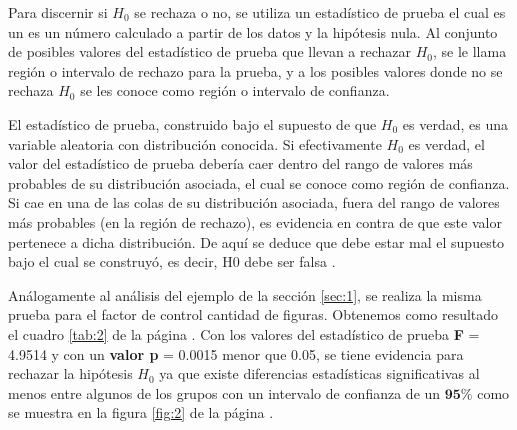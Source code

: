 \documentclass{article}
\begin{document}
Para discernir si $H_{0}$ se rechaza o no, se utiliza un estadístico de prueba el cual es un es un número calculado a partir de los datos y la hipótesis nula. Al conjunto de posibles valores del estadístico de prueba que llevan a rechazar $H_{0}$, se le llama región o intervalo de rechazo para la prueba, y a los posibles valores donde no se rechaza $H_{0}$ se les conoce como región o intervalo de confianza.

El estadístico de prueba, construido bajo el supuesto de que $H_{0}$ es verdad, es una variable aleatoria con distribución conocida. Si efectivamente $H_{0}$ es verdad, el valor del estadístico de prueba debería caer dentro del rango de valores más probables de su distribución asociada, el cual se conoce como región de confianza. Si cae en una de las colas de su distribución asociada, fuera del rango de valores más probables (en la región de rechazo), es evidencia en contra de que este valor pertenece a dicha distribución. De aquí se deduce que debe estar mal el supuesto bajo el cual se construyó, es decir, H0 debe ser falsa \cite{}.

Análogamente al análisis del ejemplo de la sección \ref{sec:1}, se realiza la misma prueba para el factor de control cantidad de figuras. Obtenemos como resultado el cuadro \ref{tab:2} de la página \pageref{tab:2}. Con los valores del estadístico de prueba \textbf{F} = 4.9514 y con un \textbf{valor p} = 0.0015 menor que 0.05, se tiene evidencia para rechazar la hipótesis $H_{0}$ ya que existe diferencias estadísticas significativas al menos entre algunos de los grupos con un intervalo de confianza de un $\textbf{95\%}$ como se muestra en la figura \ref{fig:2} de la página \pageref{fig:2}.
\end{document}
